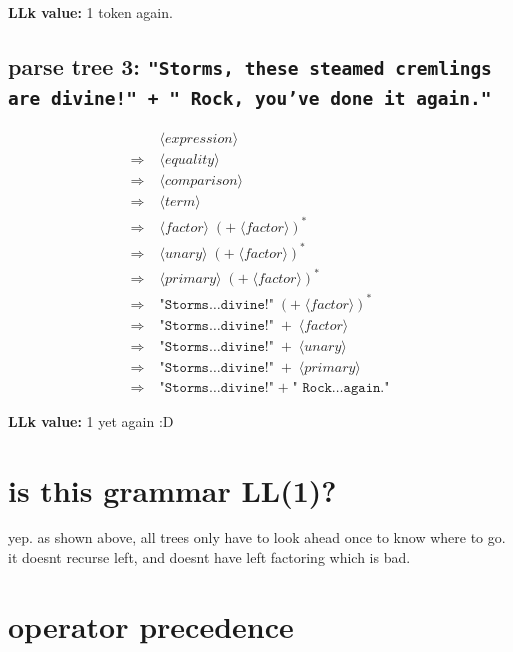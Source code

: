 \documentclass[12pt]{article}
\begin{document}
\textbf{LLk value:} 1 token again.

\subsection*{parse tree 3: \texttt{"Storms, these steamed cremlings are divine!" + " Rock, you've done it again."}}

\begin{align*}
&\langle\textit{expression}\rangle \\
\Rightarrow\;&\langle\textit{equality}\rangle \\
\Rightarrow\;&\langle\textit{comparison}\rangle \\
\Rightarrow\;&\langle\textit{term}\rangle \\
\Rightarrow\;&\langle\textit{factor}\rangle\;(+\;\langle\textit{factor}\rangle)^* \\
\Rightarrow\;&\langle\textit{unary}\rangle\;(+\;\langle\textit{factor}\rangle)^* \\
\Rightarrow\;&\langle\textit{primary}\rangle\;(+\;\langle\textit{factor}\rangle)^* \\
\Rightarrow\;&\texttt{"Storms\ldots divine!"}\;(+\;\langle\textit{factor}\rangle)^* \\
\Rightarrow\;&\texttt{"Storms\ldots divine!"}\;+\;\langle\textit{factor}\rangle \\
\Rightarrow\;&\texttt{"Storms\ldots divine!"}\;+\;\langle\textit{unary}\rangle \\
\Rightarrow\;&\texttt{"Storms\ldots divine!"}\;+\;\langle\textit{primary}\rangle \\
\Rightarrow\;&\texttt{"Storms\ldots divine!"}\;+\;\texttt{" Rock\ldots again."}
\end{align*}

\textbf{LLk value:} 1 yet again :D

\section*{is this grammar LL(1)?}

yep. as shown above, all trees only have to look ahead once to know where to go.
it doesnt recurse left, and doesnt have left factoring which is bad.


\section*{operator precedence}
\end{document}
